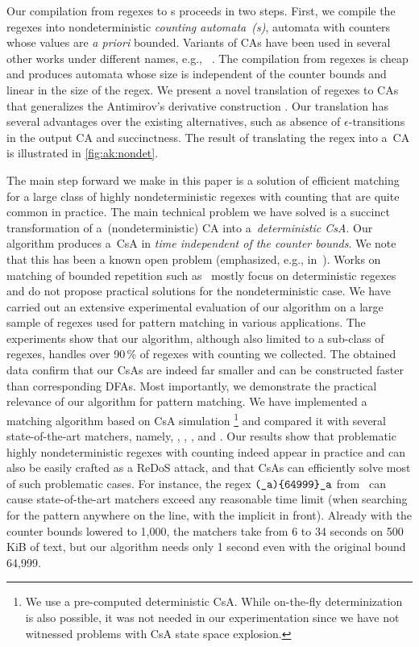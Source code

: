 \documentclass[acmsmall,screen]{acmart}
\begin{document}
Our compilation from regexes to {\CSA}s proceeds in two steps.
%
First, we compile the regexes into nondeterministic \emph{counting
automata~({\CA}s)}, automata with counters whose values are \emph{a priori}
bounded.
%
Variants of CAs have been used in several other works under different names,
%
e.g., ~\cite{aplas19,Hovland09,KilTuh07,jha_extended,Sperberg-McQueen-ExtendedFAWeb,GGM12,cikm15}.
%
The compilation from regexes is cheap and produces automata whose size is
independent of the counter bounds and linear in the size of the regex.
We present a novel translation of regexes to CAs that generalizes
the Antimirov's derivative construction \cite{Antimirov96_partderivatives}.
Our translation has several advantages over the existing alternatives, such as
absence of $\epsilon$-transitions in the output CA and succinctness. 
%
The result of translating the regex  into a~CA is
illustrated in \cref{fig:ak:nondet}.
%

The main step forward we make in this paper is a solution of efficient matching
for a large class of highly nondeterministic regexes with counting that are
quite common in practice.
%
The main technical problem we have solved is a succinct transformation
of a~(nondeterministic) CA into a~\emph{deterministic CsA}.  
%
Our algorithm produces a~CsA in \emph{time independent of
the counter bounds}.
%
We note that this has been a known open problem (emphasized, e.g., in~\cite{Sperberg-McQueen-ExtendedFAWeb}). Works on matching of bounded repetition such as~\cite{GGM12,cikm15,Hovland09,KilTuh07,SEJ08,aplas19,KT03} mostly focus on deterministic regexes and do not propose practical solutions for the nondeterministic case.
%
We have carried out an extensive experimental evaluation of our algorithm on a
large sample of regexes used for pattern matching in various applications.
%
The experiments show that our algorithm, although also limited to a sub-class of regexes,
handles over 90\,\% of regexes with counting we collected. 
%
The obtained data confirm that our CsAs are indeed far smaller and can be
constructed faster than corresponding DFAs.
%
Most importantly, we demonstrate the practical relevance of our algorithm for pattern matching. 
%
We have implemented a matching algorithm based on CsA
simulation%
\footnote{We use a pre-computed deterministic CsA. While on-the-fly
determinization is also possible, it was not needed in our experimentation since we have not witnessed problems with CsA state space explosion.
} 
and compared it
with several state-of-the-art matchers, namely, \grep \cite{grep}, \retwo \cite{re2}, \srm \cite{VSXW19}, and \dotnet \cite{dotnet}.
%
Our results show that problematic highly nondeterministic regexes with counting
indeed appear in practice and can also be easily crafted as a ReDoS attack, 
and that CsAs can efficiently solve most of such problematic cases.
For instance, the regex $\texttt{(\_a)\{64999\}\_a}$ from~\cite{DavisMCSL19}
can cause state-of-the-art matchers exceed any reasonable time limit (when searching for the pattern anywhere on the line, with the implicit \regex{\DOT*} in front). Already
with the counter bounds lowered to 1,000, the matchers take from 6 to 34 seconds
on 500\,KiB of text, but our algorithm needs only 1 second even with the
original bound 64,999.
\end{document}
